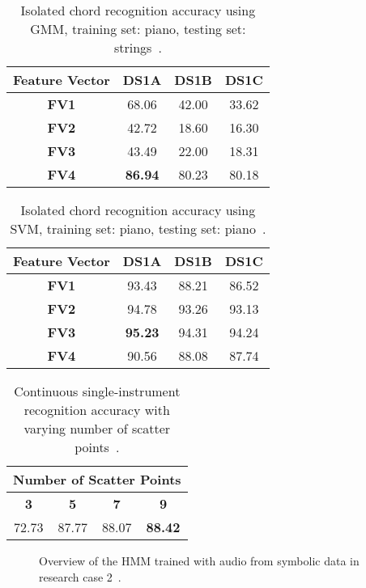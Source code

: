 \documentclass{sig-alternate}
\begin{document}
\begin{table}
\centering
\begin{tabular}{|c|c|c|c|} \hline
\textbf{Feature Vector} & \textbf{DS1A} & \textbf{DS1B} & \textbf{DS1C} \\ \hline
\textbf{FV1} & 68.06 & 42.00 & 33.62 \\ \hline
\textbf{FV2} & 42.72 & 18.60 & 16.30 \\ \hline
\textbf{FV3} & 43.49 & 22.00 & 18.31 \\ \hline
\textbf{FV4} & \textbf{86.94} & 80.23 & 80.18 \\ \hline
\end{tabular}
\caption{Isolated chord recognition accuracy using GMM, training set: piano, testing set: strings~\cite{Morman:2006}.}
\label{tab:tab4}
\end{table}

\begin{table}
\centering
\begin{tabular}{|c|c|c|c|} \hline
\textbf{Feature Vector} & \textbf{DS1A} & \textbf{DS1B} & \textbf{DS1C} \\ \hline
\textbf{FV1} & 93.43 & 88.21 & 86.52 \\ \hline
\textbf{FV2} & 94.78 & 93.26 & 93.13 \\ \hline
\textbf{FV3} & \textbf{95.23} & 94.31 & 94.24 \\ \hline
\textbf{FV4} & 90.56 & 88.08 & 87.74 \\ \hline
\end{tabular}
\caption{Isolated chord recognition accuracy using SVM, training set: piano, testing set: piano~\cite{Morman:2006}.}
\label{tab:tab7}
\end{table}

\begin{table}
\centering
\begin{tabular}{|c|c|c|c|} \hline
\multicolumn{4}{|c|}{\textbf{Number of Scatter Points}} \\ \hline
\textbf{3} & \textbf{5} & \textbf{7} & \textbf{9} \\ \hline
72.73 & 87.77 & 88.07 & \textbf{88.42} \\ \hline
\end{tabular}
\caption{Continuous single-instrument recognition accuracy with varying number of scatter points~\cite{Morman:2006}.}
\label{tab:tab8}
\end{table}

\begin{figure}[h]
\centering
{}
\caption{Overview of the HMM trained with audio from symbolic data in research case 2~\cite{Lee:2006}.}
\label{fig:fig1}
\end{figure}
\end{document}
